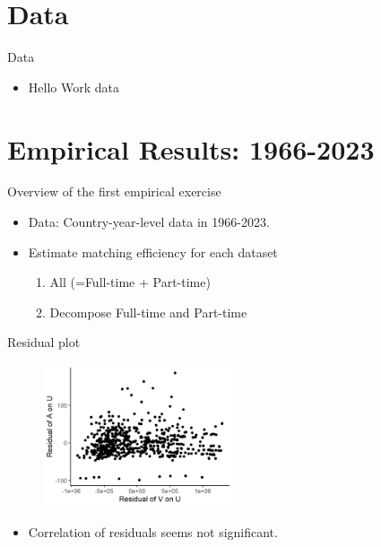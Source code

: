 \documentclass[aspectratio=169]{beamer}
\begin{document}
    


\section{Data}

\begin{frame}{Data}
  \begin{itemize}
      \item Hello Work data
  \end{itemize}
\end{frame}



\section{Empirical Results: 1966-2023}


\begin{frame}{Overview of the first empirical exercise}
    \begin{itemize}
        \item Data: Country-year-level data in 1966-2023.
        \item Estimate matching efficiency for each dataset
        \begin{enumerate}
            \item All (=Full-time + Part-time)
            \item Decompose Full-time and Part-time
        \end{enumerate}
    \end{itemize}
\end{frame}

\begin{frame}{Residual plot}
    \begin{figure}[!ht]
  \begin{center}
  \includegraphics[width = 0.50\textwidth]
  {figuretable/residual_plot_month_aggregate.png}
  \end{center}
  \footnotesize
\end{figure} 
\begin{itemize}
    \item Correlation of residuals seems not significant.
\end{itemize}
\end{frame}
\end{document}
